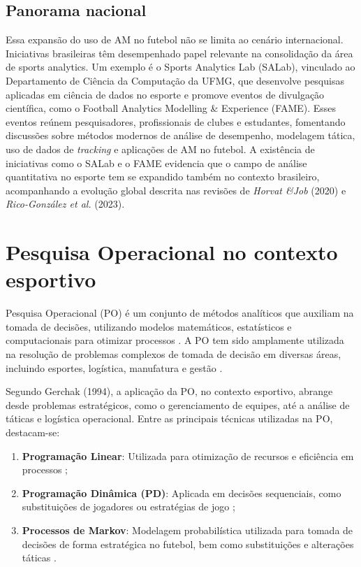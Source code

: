 \subsection{Panorama nacional}

Essa expansão do uso de AM no futebol não se limita ao cenário internacional. Iniciativas brasileiras têm desempenhado papel 
relevante na consolidação da área de sports analytics. Um exemplo é o Sports Analytics Lab (SALab), vinculado ao Departamento de Ciência da Computação da UFMG, que 
desenvolve pesquisas aplicadas em ciência de dados no esporte e promove eventos de divulgação científica, como o Football Analytics Modelling \& Experience (FAME). 
Esses eventos reúnem pesquisadores, profissionais de clubes 
e estudantes, fomentando discussões sobre métodos modernos de análise de desempenho, modelagem tática, uso de dados de \textit{tracking} e aplicações de AM no futebol. 
A existência de iniciativas como o SALab e o FAME evidencia que o campo de análise quantitativa no esporte tem se expandido também no contexto brasileiro, acompanhando 
a evolução global descrita nas revisões de \textit{Horvat \&Job} (2020) e \textit{Rico-González et al.} (2023).

\section{Pesquisa Operacional no contexto esportivo}

Pesquisa Operacional (PO) é um conjunto de métodos analíticos que auxiliam na tomada de decisões, utilizando modelos matemáticos, estatísticos e 
computacionais para otimizar processos \cite{Medri2009}. A PO tem sido amplamente utilizada na resolução de problemas complexos de tomada de decisão em diversas áreas, 
incluindo esportes, logística, manufatura e gestão \cite{Wright2009}.

Segundo Gerchak (1994), a aplicação da PO, no contexto esportivo, abrange desde problemas estratégicos, como o gerenciamento de equipes, até a análise de táticas e 
logística operacional.
Entre as principais técnicas utilizadas na PO, destacam-se:

\begin{enumerate}
    \item \textbf{Programação Linear}: Utilizada para otimização de recursos e eficiência em processos \cite{Medri2009}; 
    \item \textbf{Programação Dinâmica (PD)}: Aplicada em decisões sequenciais, como substituições de jogadores ou estratégias de jogo \cite{Clarke1998};
    \item \textbf{Processos de Markov}: Modelagem probabilística utilizada para tomada de decisões de forma estratégica no futebol, bem como substituições e 
    alterações táticas \cite{Hirotsu2002}.
\end{enumerate}

